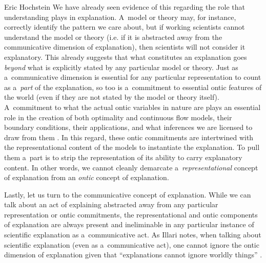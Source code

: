 \begin{artengenv}{Eric Hochstein}
We have already seen evidence of this regarding the role that understanding plays in explanation. A~model or theory may, for instance, correctly identify the pattern we care about, but if working scientists cannot understand the model or theory (i.e. if it is abstracted away from the communicative dimension of explanation), then scientists will not consider it explanatory. This already suggests that what constitutes an explanation goes \textit{beyond} what is explicitly stated by any particular model or theory. Just as a~communicative dimension is essential for any particular representation to count as a~\textit{part} of the explanation, so too is a~commitment to essential ontic features of the world (even if they are not stated by the model or theory itself). A~commitment to what the actual ontic variables in nature are plays an essential role in the creation of both optimality and continuous flow models, their boundary conditions, their applications, and what inferences we are licensed to draw from them
\parencite[see][]{hochstein_how_2019}. %
 In this regard, these ontic commitments are intertwined with the representational content of the models to instantiate the explanation. To pull them a~part is to strip the representation of its ability to carry explanatory content. In other words, we cannot cleanly demarcate a~\textit{representational} concept of explanation from an \textit{ontic} concept of explanation.

Lastly, let us turn to the communicative concept of explanation. While we can talk about an act of explaining abstracted away from any particular representation or ontic commitments, the representational and ontic components of explanation are always present and ineliminable in any particular instance of scientific explanation as a~communicative act. As Illari notes, when talking about scientific explanation (even as a~communicative act), one cannot ignore the ontic dimension of explanation given that ``explanations cannot ignore worldly things''
\parencite[][p.251]{illari_mechanistic_2013}.%



\end{artengenv}
